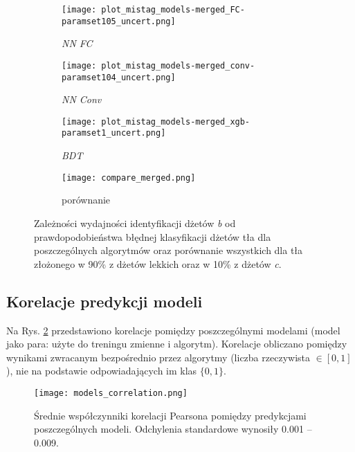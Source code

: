 \begin{figure}[h]
	\centering
	
    \begin{subfigure}[b]{0.49\textwidth}
	\texttt{[image: plot\_mistag\_models-merged\_FC-paramset105\_uncert.png]}
	\caption{\textit{NN FC}}
	\end{subfigure}
    \begin{subfigure}[b]{0.49\textwidth}
	\texttt{[image: plot\_mistag\_models-merged\_conv-paramset104\_uncert.png]}	
	\caption{\textit{NN Conv}}
	\end{subfigure}
    \begin{subfigure}[b]{0.49\textwidth}
	\texttt{[image: plot\_mistag\_models-merged\_xgb-paramset1\_uncert.png]}
	\caption{\textit{BDT}}
	\end{subfigure}
	\begin{subfigure}[b]{0.49\textwidth}
	\texttt{[image: compare\_merged.png]}
	\caption{porównanie}
	\end{subfigure}
	
	\caption{Zależności wydajności identyfikacji dżetów \textit{b} od prawdopodobieństwa błędnej klasyfikacji dżetów tła dla poszczególnych algorytmów oraz porównanie wszystkich dla tła złożonego w 90\% z dżetów lekkich oraz w 10\% z dżetów \textit{c}.}
	\label{fig:ROC_merged}
\end{figure}

\FloatBarrier
\subsection{Korelacje predykcji modeli}

Na Rys. \ref{fig:models_corr} przedstawiono korelacje pomiędzy poszczególnymi modelami (model jako para: użyte do treningu zmienne i algorytm). Korelacje obliczano pomiędzy wynikami zwracanym bezpośrednio przez algorytmy (liczba rzeczywista $\in [0,1]$), nie na podstawie odpowiadających im klas $\{0,1\}$.

\begin{figure}[h]
	\centering
	\texttt{[image: models\_correlation.png]}
	\caption{Średnie współczynniki korelacji Pearsona pomiędzy predykcjami poszczególnych modeli. Odchylenia standardowe wynosiły 0.001 -- 0.009.}
	\label{fig:models_corr}
\end{figure}







